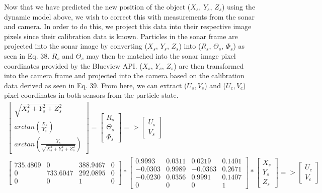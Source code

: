 \documentclass[15pt]{article}
\let\Theta\varTheta
\let\Phi\varPhi
\newcommand{\RSonar}{$\si{\textit{R}_{s}}$\xspace}
\newcommand{\ThetaSonar}{$\si{\Theta_{s}}$\xspace}
\newcommand{\PhiSonar}{$\si{\Phi_{s}}$\xspace}
\newcommand{\XSonar}{$\si{\textit{X}_{s}}$\xspace}
\newcommand{\YSonar}{$\si{\textit{Y}_{s}}$\xspace}
\newcommand{\ZSonar}{$\si{\textit{Z}_{s}}$\xspace}
\begin{document}
Now that we have predicted the new position of the object (\XSonar, \YSonar, \ZSonar) using the dynamic model above, we wish to correct this with measurements from the sonar and camera. In order to do this, we project this data into their respective image pixels since their calibration data is known. Particles in the sonar frame are projected into the sonar image by converting (\XSonar, \YSonar, \ZSonar) into (\RSonar, \ThetaSonar, \PhiSonar) as seen in Eq. 38. \RSonar and \ThetaSonar may then be matched into the sonar image pixel coordinates provided by the Blueview API. (\XSonar, \YSonar, \ZSonar) are then transformed into the camera frame and projected into the camera based on the calibration data derived as seen in Eq. 39. From here, we can extract ($U_{s}, V_{s}$) and ($U_{c}, V_{c}$) pixel coordinates in both sensors from the particle state.
\begin{gather}
\left[\begin{array}{c}
\sqrt{X_{s}^{2}+Y_{s}^{2}+Z_{s}^{2}}\\
arctan(\frac{X_{s}}{Y_{s}})\\
arctan(\frac{Y_{s}}{\sqrt{X_{s}^{2}+Y_{s}^{2}+Z_{s}^{2}}})
\end{array}\right]=\left[\begin{array}{c}
R_{s}\\
\Theta_{s}\\
\Phi_{s}
\end{array}\right]=>\left[\begin{array}{c}
U_{s}\\
V_{s}
\end{array}\right] \\
\left[\begin{array}{cccc}
735.4809 & 0 & 388.9467 & 0\\
0 & 733.6047 & 292.0895 & 0\\
0 & 0 & 1 & 0
\end{array}\right]*\left[\begin{array}{cccc}
0.9993 & 0.0311 & 0.0219 & 0.1401\\
-0.0303 & 0.9989 & -0.0363 & 0.2671\\
-0.0230 & 0.0356 & 0.9991 & 0.1407\\
0 & 0 & 0 & 1
\end{array}\right]*
\left[\begin{array}{c}
X_{s}\\
Y_{s}\\
Z_{s}
\end{array}\right]=>\left[\begin{array}{c}
U_{c}\\
V_{c}
\end{array}\right]
\end{gather}
\end{document}
